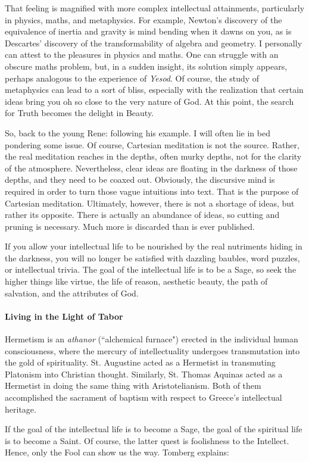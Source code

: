 That feeling is magnified with more complex intellectual attainments, particularly in physics, maths, and metaphysics. For example, Newton's discovery of the equivalence of inertia and gravity is mind bending when it dawns on you, as is Descartes' discovery of the transformability of algebra and geometry. I personally can attest to the pleasures in physics and maths. One can struggle with an obscure maths problem, but, in a sudden insight, its solution simply appears, perhaps analogous to the experience of \emph{Yesod}. Of course, the study of metaphysics can lead to a sort of bliss, especially with the realization that certain ideas bring you oh so close to the very nature of God. At this point, the search for Truth becomes the delight in Beauty.

So, back to the young Rene: following his example. I will often lie in bed pondering some issue. Of course, Cartesian meditation is not the source. Rather, the real meditation reaches in the depths, often murky depths, not for the clarity of the atmosphere. Nevertheless, clear ideas are floating in the darkness of those depths, and they need to be coaxed out. Obviously, the discursive mind is required in order to turn those vague intuitions into text. That is the purpose of Cartesian meditation. Ultimately, however, there is not a shortage of ideas, but rather its opposite. There is actually an abundance of ideas, so cutting and pruning is necessary. Much more is discarded than is ever published.

If you allow your intellectual life to be nourished by the real nutriments hiding in the darkness, you will no longer be satisfied with dazzling baubles, word puzzles, or intellectual trivia. The goal of the intellectual life is to be a Sage, so seek the higher things like virtue, the life of reason, aesthetic beauty, the path of salvation, and the attributes of God.

\paragraph{Living in the Light of Tabor}
\begin{quotex}
Hermetism is an \emph{athanor }(``alchemical furnace") erected in the individual human consciousness, where the mercury of intellectuality undergoes transmutation into the gold of spirituality. St. Augustine acted as a Hermetist in transmuting Platonism into Christian thought. Similarly, St. Thomas Aquinas acted as a Hermetist in doing the same thing with Aristotelianism. Both of them accomplished the sacrament of baptism with respect to Greece's intellectual heritage. 

\end{quotex}
If the goal of the intellectual life is to become a Sage, the goal of the spiritual life is to become a Saint. Of course, the latter quest is foolishness to the Intellect. Hence, only the Fool can show us the way. Tomberg explains:

